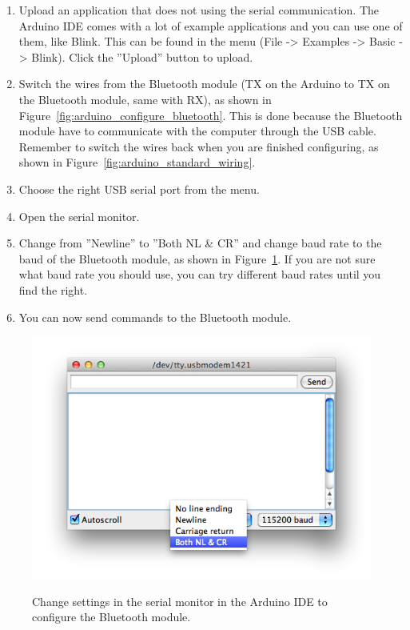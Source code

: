 		\begin{enumerate}
		\item Upload an application that does not using the serial communication. The Arduino IDE comes with a lot of example applications and you can use one of them, like Blink. This can be found in the menu (File -> Examples -> Basic -> Blink). Click the ''Upload'' button to upload.
		
		\item Switch the wires from the Bluetooth module (TX on the Arduino to TX on the Bluetooth module, same with RX), as shown in Figure~\ref{fig:arduino_configure_bluetooth}. This is done because the Bluetooth module have to communicate with the computer through the USB cable. Remember to switch the wires back when you are finished configuring, as shown in Figure~\ref{fig:arduino_standard_wiring}.
		
		\item Choose the right USB serial port from the menu.
		
		\item Open the serial monitor.
		
		\item Change from ''Newline'' to ''Both NL \& CR'' and change baud rate to the baud of the Bluetooth module, as shown in Figure~\ref{fig:serial_monitor}. If you are not sure what baud rate you should use, you can try different baud rates until you find the right.
		
		\item You can now send commands to the Bluetooth module.
		\end{enumerate}
		
		\begin{figure}[H]
			\caption{Change settings in the serial monitor in the Arduino IDE to configure the Bluetooth module.}
			\centering
			\includegraphics[scale=0.5]{images/serial_monitor.png}
			\label{fig:serial_monitor}
		\end{figure}
		
